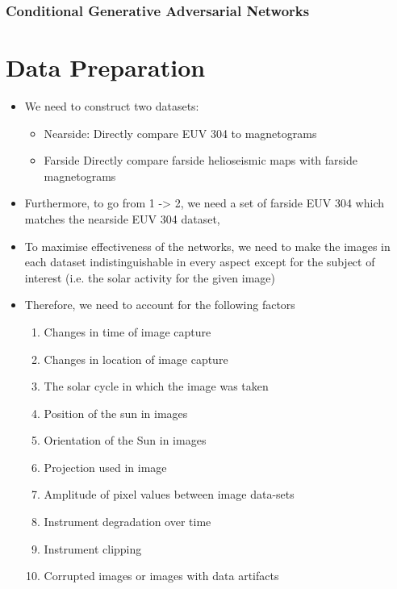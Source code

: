 \documentclass[11pt,a4paper,onecolumn]{report}
\begin{document}
%
\subsection{Conditional Generative Adversarial Networks}
%





%
%
%
%
\chapter{Data Preparation}
%
%
%
%




\begin{itemize}

  \item We need to construct two datasets:
  
  \begin{itemize}
    \item Nearside: Directly compare EUV 304 to magnetograms
    \item Farside Directly compare farside helioseismic maps with farside magnetograms
  \end{itemize}
  
  \item Furthermore, to go from 1 -> 2,  we need a set of farside EUV 304 which
  matches the nearside EUV 304 dataset,

  \item To maximise effectiveness of the networks, we need to make the images in
  each dataset indistinguishable in every aspect except for the subject of
  interest (i.e. the solar activity for the given image)

  
  \item Therefore, we need to account for the following factors
  
  \begin{enumerate}[i]
    \item Changes in time of image capture
    \item Changes in location of image capture
    \item The solar cycle in which the image was taken
    \item Position of the sun in images
    \item Orientation of the Sun in images
    \item Projection used in image
    \item Amplitude of pixel values between image data-sets
    \item Instrument degradation over time
    \item Instrument clipping
    \item Corrupted images or images with data artifacts
  \end{enumerate}




\end{itemize}
\end{document}
